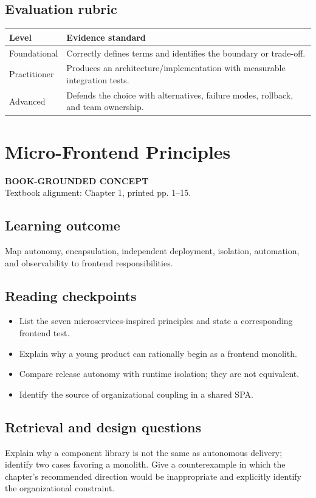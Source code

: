 \documentclass[11pt,letterpaper,oneside]{report}
\newcommand{\based}[1]{\begin{sourcebox}\textbf{BOOK-GROUNDED CONCEPT}\\#1\end{sourcebox}}
\begin{document}
\section*{Evaluation rubric}
\begin{tabularx}{\linewidth}{p{.18\linewidth}X}\toprule Level & Evidence standard \\\midrule
Foundational & Correctly defines terms and identifies the boundary or trade-off.\\
Practitioner & Produces an architecture/implementation with measurable integration tests.\\
Advanced & Defends the choice with alternatives, failure modes, rollback, and team ownership.\\\bottomrule\end{tabularx}

\chapter{Micro-Frontend Principles}
\based{Textbook alignment: Chapter 1, printed pp. 1--15.}
\section{Learning outcome}
Map autonomy, encapsulation, independent deployment, isolation, automation, and observability to frontend responsibilities.
\section{Reading checkpoints}
\begin{itemize}\item List the seven microservices-inspired principles and state a corresponding frontend test.
\item Explain why a young product can rationally begin as a frontend monolith.
\item Compare release autonomy with runtime isolation; they are not equivalent.
\item Identify the source of organizational coupling in a shared SPA.
\end{itemize}
\section{Retrieval and design questions}
Explain why a component library is not the same as autonomous delivery; identify two cases favoring a monolith. Give a counterexample in which the chapter's recommended direction would be inappropriate and explicitly identify the organizational constraint.
\end{document}
